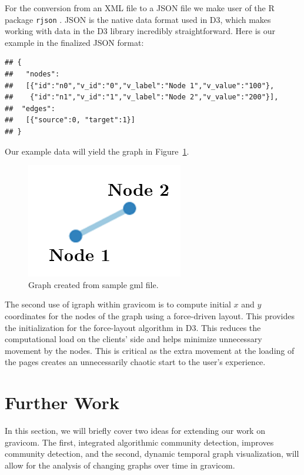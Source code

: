 \documentclass{article}\usepackage[]{graphicx}\usepackage[]{color}
\makeatletter
\newenvironment{kframe}{%
 \def\at@end@of@kframe{}%
 \ifinner\ifhmode%
  \def\at@end@of@kframe{\end{minipage}}%
  \begin{minipage}{\columnwidth}%
 \fi\fi%
 \def\FrameCommand##1{\hskip\@totalleftmargin \hskip-\fboxsep
 \colorbox{shadecolor}{##1}\hskip-\fboxsep
     \hskip-\linewidth \hskip-\@totalleftmargin \hskip\columnwidth}%
 \MakeFramed {\advance\hsize-\width
   \@totalleftmargin\z@ \linewidth\hsize
   \@setminipage}}%
 {\par\unskip\endMakeFramed%
 \at@end@of@kframe}
\newenvironment{knitrout}{}{} %
\makeatother
\begin{document}
For the conversion from an  XML file  to a JSON file we make user of the R package {\tt rjson} \cite{acb-rjson}.  JSON is the native data format used in D3, which  makes working with data in the D3 library incredibly straightforward. Here is our example in the finalized JSON format:
\begin{knitrout}
\color{fgcolor}\begin{kframe}
\begin{verbatim}
## {
##   "nodes":
##   [{"id":"n0","v_id":"0","v_label":"Node 1","v_value":"100"}, 
##    {"id":"n1","v_id":"1","v_label":"Node 2","v_value":"200"}], 
##  "edges":
##   [{"source":0, "target":1}]
## }
\end{verbatim}
\end{kframe}
\end{knitrout}

Our example data will yield the graph in Figure~\ref{fig:samplegraph}.

\begin{figure}[H]
\centering
\includegraphics{images/samplegraph.png}
\caption{\label{fig:samplegraph} Graph created from sample gml file.}
\end{figure}
The second use of igraph within gravicom is to compute initial $x$ and $y$ coordinates for the nodes of the graph using a force-driven layout. This provides the initialization for the force-layout algorithm in D3. This reduces the computational load on the clients' side and helps minimize unnecessary movement by the nodes. This is critical as the extra movement at the loading of the pages creates an unnecessarily chaotic start to the user's experience. 




\section{Further Work}

In this section, we will briefly cover two ideas for extending our work on gravicom.  The first, integrated algorithmic community detection, improves community detection, and the second, dynamic temporal graph visualization, will allow for the analysis of changing graphs over time in gravicom.
\end{document}
